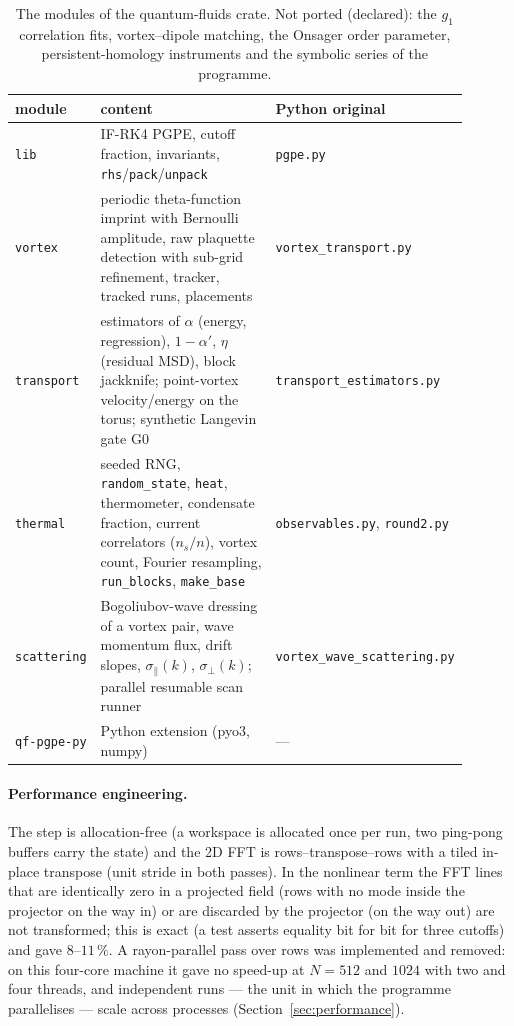 \documentclass[11pt,a4paper]{article}
\begin{document}
\begin{table}[h]\centering\small
\begin{tabular}{p{0.14\linewidth}p{0.5\linewidth}p{0.26\linewidth}}\toprule
module & content & Python original\\\midrule
\texttt{lib} & IF-RK4 PGPE, cutoff fraction, invariants, \texttt{rhs}/\texttt{pack}/\texttt{unpack} & \texttt{pgpe.py}\\
\texttt{vortex} & periodic theta-function imprint with Bernoulli amplitude, raw plaquette detection with sub-grid refinement, tracker, tracked runs, placements & \texttt{vortex\_transport.py}\\
\texttt{transport} & estimators of $\alpha$ (energy, regression), $1-\alpha'$, $\eta$ (residual MSD), block jackknife; point-vortex velocity/energy on the torus; synthetic Langevin gate G0 & \texttt{transport\_estimators.py}\\
\texttt{thermal} & seeded RNG, \texttt{random\_state}, \texttt{heat}, thermometer, condensate fraction, current correlators ($n_s/n$), vortex count, Fourier resampling, \texttt{run\_blocks}, \texttt{make\_base} & \texttt{observables.py}, \texttt{round2.py}\\
\texttt{scattering} & Bogoliubov-wave dressing of a vortex pair, wave momentum flux, drift slopes, $\sigma_\parallel(k)$, $\sigma_\perp(k)$; parallel resumable scan runner & \texttt{vortex\_wave\_scattering.py}\\
\texttt{qf-pgpe-py} & Python extension (pyo3, numpy) & ---\\\bottomrule
\end{tabular}
\caption{The modules of the quantum-fluids crate. Not ported (declared): the $g_1$ correlation fits, vortex--dipole matching, the Onsager order parameter, persistent-homology instruments and the symbolic series of the programme.}\label{tab:modules}
\end{table}

\paragraph{Performance engineering.} The step is allocation-free (a workspace is allocated once per run, two ping-pong buffers carry the state) and the 2D FFT is rows--transpose--rows with a tiled in-place transpose (unit stride in both passes). In the nonlinear term the
FFT lines that are identically zero in a projected field (rows with no mode inside the projector on the way in) or are discarded by the projector (on the way out) are not transformed; this is exact (a test asserts equality bit for bit for three cutoffs) and gave $8$--$11\,\%$.
A rayon-parallel pass over rows was implemented and removed: on this four-core machine it gave no speed-up at $N=512$ and $1024$ with two and four threads, and independent runs --- the unit in which the programme parallelises --- scale across processes (Section~\ref{sec:performance}).
\end{document}
